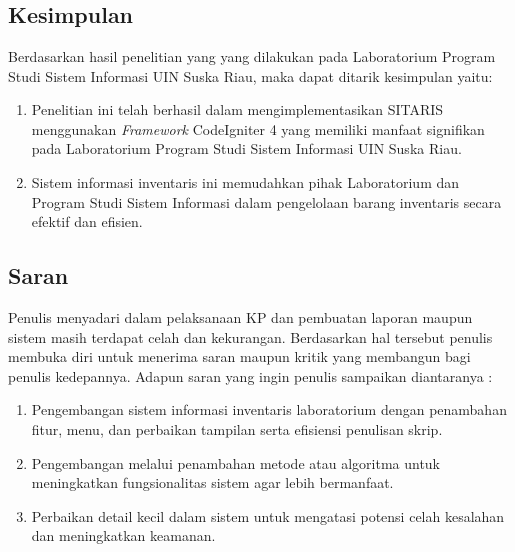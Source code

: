 %


%

\chapter{\babLima}
\section{Kesimpulan}
Berdasarkan hasil penelitian yang yang dilakukan pada Laboratorium Program Studi Sistem Informasi UIN Suska Riau, maka dapat ditarik kesimpulan yaitu:

\begin{enumerate}
    \item Penelitian ini telah berhasil dalam mengimplementasikan SITARIS menggunakan \textit{Framework} CodeIgniter 4 yang memiliki manfaat signifikan pada Laboratorium Program Studi Sistem Informasi UIN Suska Riau.
    \item Sistem informasi inventaris ini memudahkan pihak Laboratorium dan Program Studi Sistem Informasi dalam pengelolaan barang inventaris secara efektif dan efisien.
\end{enumerate}

\section{Saran}
Penulis menyadari dalam pelaksanaan KP dan pembuatan laporan maupun sistem masih terdapat celah dan kekurangan. Berdasarkan hal tersebut penulis membuka diri untuk menerima saran maupun kritik yang membangun bagi penulis kedepannya. Adapun saran yang ingin penulis sampaikan diantaranya :
\begin{enumerate}
    \item Pengembangan sistem informasi inventaris laboratorium dengan penambahan fitur, menu, dan perbaikan tampilan serta efisiensi penulisan skrip.
    \item Pengembangan melalui penambahan metode atau algoritma untuk meningkatkan fungsionalitas sistem agar lebih bermanfaat.
    \item Perbaikan detail kecil dalam sistem untuk mengatasi potensi celah kesalahan dan meningkatkan keamanan.
\end{enumerate}